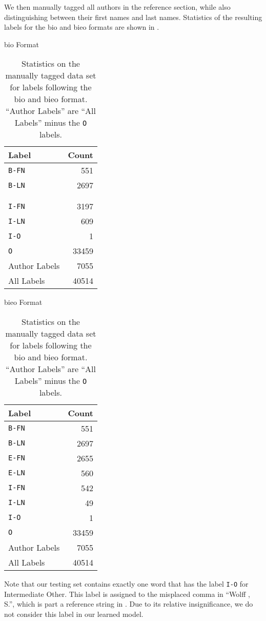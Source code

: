 We then manually tagged all authors in the reference section, while also distinguishing between their first names and last names.
Statistics of the resulting labels for the \gls{bio} and \gls{bieo} formats are shown in .
\begin{table}
\centering
\begin{minipage}[t]{0.3\linewidth}
\centering
\gls{bio} Format\par
\smallskip
\begin{tabular}{l r}
  \toprule
  Label & Count\\
  \midrule
  \texttt{B-FN}    & \num{551}\\
  \texttt{B-LN}    & \num{2697}\\
                   & \\
                   & \\
  \texttt{I-FN}    & \num{3197}\\
  \texttt{I-LN}    & \num{609}\\
  \texttt{I-O}     & \num{1}\\
  \texttt{O}       & \num{33459}\\
  \midrule
  Author Labels    & \num{7055}\\
  All Labels       & \num{40514}\\
  \bottomrule
\end{tabular}
\end{minipage}
\quad
\begin{minipage}[t]{0.3\linewidth}
\centering
\gls{bieo} Format\par
\smallskip
\begin{tabular}{l r}
  \toprule
  Label & Count\\
  \midrule
  \texttt{B-FN}    & \num{551}\\
  \texttt{B-LN}    & \num{2697}\\
  \texttt{E-FN}    & \num{2655}\\
  \texttt{E-LN}    & \num{560}\\
  \texttt{I-FN}    & \num{542}\\
  \texttt{I-LN}    & \num{49}\\
  \texttt{I-O}     & \num{1}\\
  \texttt{O}       & \num{33459}\\
  \midrule
  Author Labels    & \num{7055}\\
  All Labels       & \num{40514}\\
  \bottomrule
\end{tabular}
\end{minipage}
\caption{Statistics on the manually tagged data set for labels following the \gls{bio} and \gls{bieo} format. ``Author Labels'' are ``All Labels'' minus the \texttt{O} labels.}
\label{tab:statistics-manually-tagged}
\end{table}
Note that our testing set contains exactly one word that has the label \texttt{I-O} for Intermediate Other.
This label is assigned to the misplaced comma in ``Wolff , S.'', which is part a reference string in \citet{morth1998spurensuche}.
Due to its relative insignificance, we do not consider this label in our learned model.

